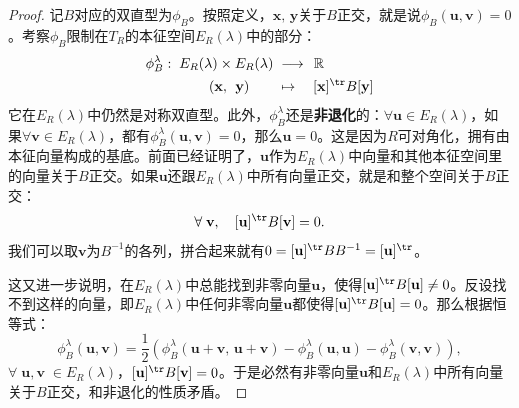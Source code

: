 \documentclass[12pt,UTF8,fontset=none]{ctexbook}
\begin{document}
\begin{appendix}
\begin{proof}
    记$B$对应的双直型为$\phi_B$。按照定义，$\mathbf{x},\, \mathbf{y}$关于$B$正交，就是说$\phi_B(\mathbf{u}, \mathbf{v}) = 0$。考察$\phi_B$限制在$T_R$的本征空间$E_R(\lambda)$中的部分：
    \begin{align*}
        \phi_B^{\lambda}: \; E_R(\lambda)\times E_R(\lambda)\; &\longrightarrow \;\, \mathbb{R} \\
        (\mathbf{x},\,\; \mathbf{y}) \quad\quad &\mapsto \quad [\mathbf{x}]^{\tr}B[\mathbf{y}]
    \end{align*}
    它在$E_R(\lambda)$中仍然是对称双直型。此外，$\phi_B^{\lambda}$还是\textbf{非退化}的：$\forall \mathbf{u}\in E_R(\lambda)$，如果$\forall \mathbf{v} \in E_R(\lambda)$，都有$\phi_B^{\lambda}(\mathbf{u}, \mathbf{v}) = 0$，那么$\mathbf{u} = 0$。这是因为$R$可对角化，拥有由本征向量构成的基底。前面已经证明了，$\mathbf{u}$作为$E_R(\lambda)$中向量和其他本征空间里的向量关于$B$正交。如果$\mathbf{u}$还跟$E_R(\lambda)$中所有向量正交，就是和整个空间关于$B$正交：
    $$ \forall \; \mathbf{v}, \quad [\mathbf{u}]^{\tr}B[\mathbf{v}] = 0. $$
    我们可以取$\mathbf{v}$为$B^{-1}$的各列，拼合起来就有$0 = [\mathbf{u}]^{\tr}BB^{-1} = [\mathbf{u}]^{\tr}$。

    这又进一步说明，在$E_R(\lambda)$中总能找到非零向量$\mathbf{u}$，使得$[\mathbf{u}]^{\tr}B[\mathbf{u}] \neq 0$。反设找不到这样的向量，即$E_R(\lambda)$中任何非零向量$\mathbf{u}$都使得$[\mathbf{u}]^{\tr}B[\mathbf{u}] = 0$。那么根据恒等式：
    $$
    \phi_B^{\lambda}(\mathbf{u}, \mathbf{v}) = \frac{1}{2}\left(\phi_B^{\lambda}(\mathbf{u}+\mathbf{v},\,\mathbf{u}+\mathbf{v}) - \phi_B^{\lambda}(\mathbf{u},\mathbf{u}) - \phi_B^{\lambda}(\mathbf{v},\mathbf{v})\right), 
    $$
    $\forall\;\mathbf{u}, \mathbf{v}\; \in E_R(\lambda)$，$[\mathbf{u}]^{\tr}B[\mathbf{v}] = 0$。于是必然有非零向量$\mathbf{u}$和$E_R(\lambda)$中所有向量关于$B$正交，和非退化的性质矛盾。


\end{proof}
\end{appendix}
\end{document}
